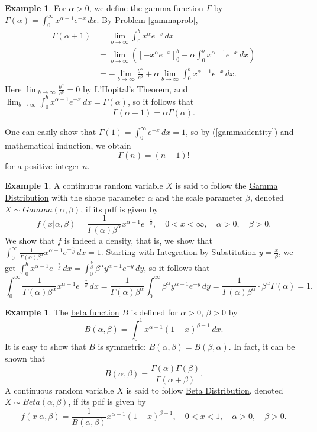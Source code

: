\documentclass[12pt,letterpaper]{book}
\numberwithin{equation}{section}
\theoremstyle{definition}
\newtheorem{example}[thm]{\textbf{Example}}
\begin{document}
\begin{example}\label{gammafcndef}
For $\alpha>0$, we define the \underline{gamma function} $\Gamma$ by $\displaystyle{\Gamma(\alpha)=\int_{0}^\infty x^{\alpha-1}e^{-x}\,dx}$. By Problem \ref{gammaprob},
\begin{align*}\Gamma(\alpha+1)&=\lim_{b\to \infty}\int_{0}^b x^{\alpha}e^{-x}\,dx\\
&=\lim_{b\to \infty}\left(\left[-x^\alpha e^{-x}\right]_0^b+\alpha\int_0^b x^{\alpha-1}e^{-x}\,dx\right)\\
&=-\lim_{b\to \infty}\frac{b^\alpha}{e^b}+\alpha\lim_{b\to \infty}\int_0^b x^{\alpha-1}e^{-x}\,dx.\end{align*}
Here $\displaystyle{\lim_{b\to \infty}\frac{b^\alpha}{e^b}=0}$ by L'Hopital's Theorem, and $\displaystyle{\lim_{b\to \infty}\int_0^b x^{\alpha-1}e^{-x}\,dx=\Gamma(\alpha)}$, so it follows that
\begin{equation}\label{gammaidentity}\Gamma(\alpha+1)=\alpha\Gamma(\alpha).\end{equation}
\end{example}
One can easily show that $\displaystyle{\Gamma(1)=\int_0^\infty e^{-x}\,dx=1}$, so by (\ref{gammaidentity}) and mathematical induction, we obtain $$\Gamma(n)=(n-1)!$$ for a positive integer $n$.

\begin{example}
A continuous random variable $X$ is said to follow the \underline{Gamma Distribution} with the shape parameter $\alpha$ and the scale parameter $\beta$, denoted $X\sim Gamma(\alpha,\beta)$, if its pdf is given by
$$f(x|\alpha,\beta)=\frac{1}{\Gamma(\alpha)\beta^\alpha}x^{\alpha-1}e^{-\frac{x}{\beta}},\quad 0<x<\infty,\quad \alpha>0,\quad \beta>0.$$ We show that $f$ is indeed a density, that is, we show that $\displaystyle{\int_0^\infty \frac{1}{\Gamma(\alpha)\beta^\alpha}x^{\alpha-1}e^{-\frac{x}{\beta}}\,dx=1}$. Starting with Integration by Substitution $y=\frac{x}{\beta}$, we get $\displaystyle{\int_0^b x^{\alpha-1}e^{-\frac{x}{\beta}}\,dx=\int_0^{\frac{b}{\beta}} \beta^\alpha y^{\alpha-1}e^{-y}\,dy}$, so it follows that
$$\int_0^\infty \frac{1}{\Gamma(\alpha)\beta^\alpha}x^{\alpha-1}e^{-\frac{x}{\beta}}\,dx= \frac{1}{\Gamma(\alpha)\beta^\alpha}\int_0^\infty \beta^\alpha y^{\alpha-1}e^{-y}\,dy=\frac{1}{\Gamma(\alpha)\beta^\alpha}\cdot\beta^\alpha\Gamma(\alpha)=1.$$
\end{example}

\begin{example}
The \underline{beta function} $B$ is defined for $\alpha>0$, $\beta>0$ by
$$B(\alpha,\beta)=\int_0^1 x^{\alpha-1}(1-x)^{\beta-1}\,dx.$$
It is easy to show that $B$ is symmetric: $B(\alpha,\beta)=B(\beta,\alpha)$. In fact, it can be shown that
$$B(\alpha,\beta)=\frac{\Gamma(\alpha)\Gamma(\beta)}{\Gamma(\alpha+\beta)}.$$
A continuous random variable $X$ is said to follow \underline{Beta Distribution}, denoted $X\sim Beta(\alpha,\beta)$,  if its pdf is given by
$$f(x|\alpha,\beta)=\frac{1}{B(\alpha,\beta)}x^{\alpha-1}(1-x)^{\beta-1},\quad 0<x<1,\quad \alpha>0,\quad \beta>0.$$
\end{example}
\end{document}
